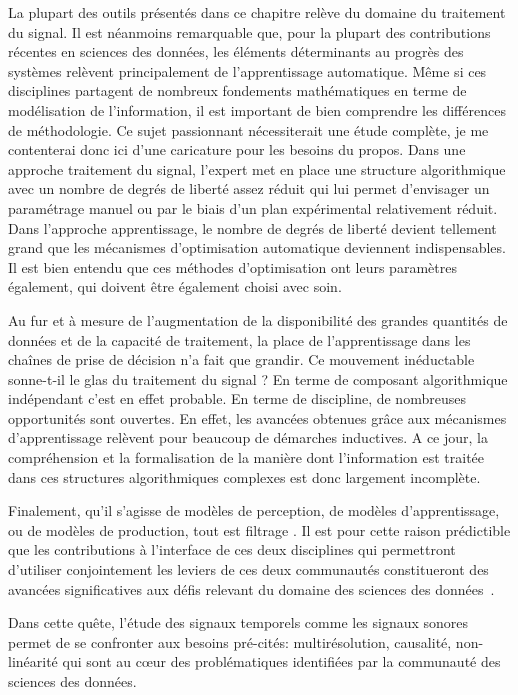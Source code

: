 La plupart des outils présentés dans ce chapitre relève du domaine du traitement du signal. Il est néanmoins remarquable que, pour la plupart des contributions récentes en sciences des données, les éléments déterminants au progrès des systèmes relèvent principalement de l'apprentissage automatique. Même si ces disciplines partagent de nombreux fondements mathématiques en terme de modélisation de l'information, il est important de bien comprendre les différences de méthodologie. Ce sujet passionnant nécessiterait une étude complète, je me contenterai donc ici d'une caricature pour les besoins du propos. Dans une approche traitement du signal, l'expert met en place une structure algorithmique avec un nombre de degrés de liberté assez réduit qui lui permet d'envisager un paramétrage manuel ou par le biais d'un plan expérimental relativement réduit. Dans l'approche apprentissage, le nombre de degrés de liberté devient tellement grand que les mécanismes d'optimisation automatique deviennent indispensables. Il est bien entendu que ces méthodes d'optimisation ont leurs paramètres également, qui doivent être également choisi avec soin.

Au fur et à mesure de l'augmentation de la disponibilité des grandes quantités de données et de la capacité de traitement, la place de l'apprentissage dans les chaînes de prise de décision n'a fait que grandir. Ce mouvement inéductable sonne-t-il le glas du traitement du signal ? En terme de composant algorithmique indépendant c'est en effet probable. En terme de discipline, de nombreuses opportunités sont ouvertes. En effet, les avancées obtenues grâce aux mécanismes d'apprentissage relèvent pour beaucoup de démarches inductives. A ce jour, la compréhension et la formalisation de la manière dont l'information est traitée dans ces structures algorithmiques complexes est donc largement incomplète.

Finalement, qu'il s'agisse de modèles de perception, de modèles d'apprentissage, ou de modèles de production, \og tout est filtrage \fg. Il est pour cette raison prédictible que les contributions à l'interface de ces deux disciplines qui permettront d'utiliser conjointement les leviers de ces deux communautés constitueront des avancées significatives aux défis relevant du domaine des sciences des données~\cite{mallat2016understanding}.

Dans cette quête, l'étude des signaux temporels comme les signaux sonores permet de se confronter aux besoins pré-cités: multirésolution, causalité, non-linéarité qui sont au c\oe{}ur des problématiques identifiées par la communauté des sciences des données.

